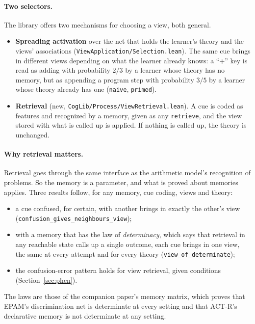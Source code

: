 \documentclass[11pt]{article}
\newcommand{\code}[1]{\texttt{#1}}
\newcommand{\lean}[1]{\texttt{#1}}
\begin{document}
\paragraph{Two selectors.} The library offers two mechanisms for choosing a view, both general.
\begin{itemize}
  \item \textbf{Spreading activation} \citep{collins1975} over the net that holds the learner's theory and the views' associations (\code{ViewApplication/Selection.lean}). The same cue brings in different views depending on what the learner already knows: a ``+'' key is read as adding with probability $2/3$ by a learner whose theory has no memory, but as appending a program step with probability $3/5$ by a learner whose theory already has one (\lean{naive}, \lean{primed}).
  \item \textbf{Retrieval} (new, \code{CogLib/Process/ViewRetrieval.lean}). A cue is coded as features and recognized by a memory, given as any \code{retrieve}, and the view stored with what is called up is applied. If nothing is called up, the theory is unchanged.
\end{itemize}

\paragraph{Why retrieval matters.} Retrieval goes through the same interface as the arithmetic model's recognition of problems. So the memory is a parameter, and what is proved about memories applies. Three results follow, for any memory, cue coding, views and theory:
\begin{itemize}
  \item a cue confused, for certain, with another brings in exactly the other's view (\lean{confusion\_gives\_neighbours\_view});
  \item with a memory that has the law of \emph{determinacy}, which says that retrieval in any reachable state calls up a single outcome, each cue brings in one view, the same at every attempt and for every theory (\lean{view\_of\_determinate});
  \item the confusion-error pattern holds for view retrieval, given conditions (Section~\ref{sec:phen}).
\end{itemize}
The laws are those of the companion paper's memory matrix, which proves that EPAM's discrimination net is determinate at every setting and that ACT-R's declarative memory \citep{anderson2007} is not determinate at any setting.
\end{document}
